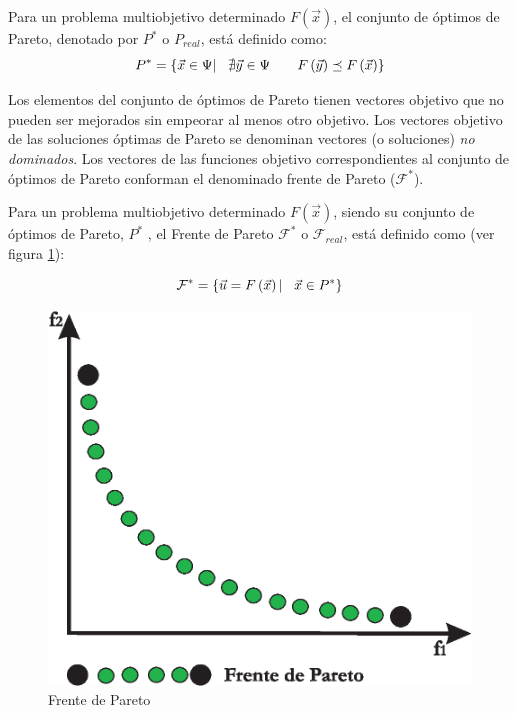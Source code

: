       \begin{definicion}
	Para un problema multiobjetivo determinado $F\left(\vec{x}\right)$, el conjunto de \'optimos de Pareto, denotado por $P^*$ 
	o $P_{real}$, est\'a definido como:	
	\[
	P^*= \left\{ \vec{x} \in \Psi |\hspace{0.3cm} \nexists \vec{y}\in \Psi \hspace{0.7cm} F\left(\vec{y}\right)\preceq F\left(\vec{x}\right) \right\}\]
      \end{definicion}
      
      Los elementos del conjunto de \'optimos de Pareto tienen vectores objetivo que no pueden ser mejorados sin empeorar al menos otro
      objetivo. Los vectores objetivo de las soluciones \'optimas de Pareto se denominan vectores (o soluciones) \textit{no dominados}.
      Los vectores de las funciones objetivo correspondientes al conjunto de \'optimos de Pareto conforman el denominado frente de Pareto 
      ($\mathcal{F}^*$).
      
      \begin{definicion}
      Para un problema multiobjetivo determinado $F\left(\vec{x} \right)$, siendo su conjunto de \'optimos de Pareto, $P^*$ , el Frente 
      de Pareto $\mathcal{F}^*$ o $\mathcal{F}_{real}$, est\'a definido como (ver figura \ref{fig:pareto}):
      
	  \[\mathcal{F}^*=\left\{ \vec{u} = F\left(\vec{x}\right) | \hspace{0.3cm} \vec{x}\in P^*\right\}\]
      \end{definicion}
      
      \begin{figure}
	\centering
	\includegraphics[scale=0.65]{Cap2/1-2.eps}
	  \caption{Frente de Pareto}
      \label{fig:pareto}
      \end{figure}
      
